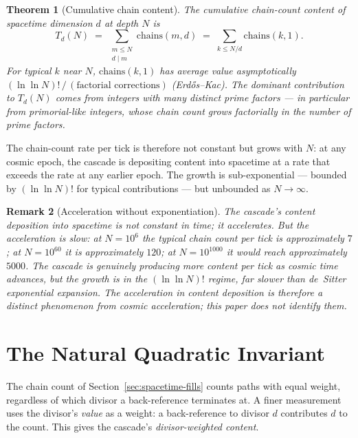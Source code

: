 \documentclass[11pt,a4paper]{article}
\newtheorem{theorem}{Theorem}[section]
\newtheorem{remark}[theorem]{Remark}
\begin{document}
\begin{theorem}[Cumulative chain content]\label{thm:chain-cumulative}
The cumulative chain-count content of spacetime dimension $d$ at
depth $N$ is
\[
T_d(N) \;=\; \sum_{\substack{m \leq N \\ d \mid m}} \mathrm{chains}(m, d) \;=\; \sum_{k \leq N/d} \mathrm{chains}(k, 1).
\]
For typical $k$ near $N$, $\mathrm{chains}(k, 1)$ has average value
asymptotically $(\ln\ln N)!\, /\, (\text{factorial corrections})$
(Erdős--Kac). The dominant contribution to $T_d(N)$ comes from
integers with many distinct prime factors --- in particular from
primorial-like integers, whose chain count grows factorially in the
number of prime factors.
\end{theorem}

\noindent The chain-count rate per tick is therefore not constant
but grows with $N$: at any cosmic epoch, the cascade is depositing
content into spacetime at a rate that exceeds the rate at any
earlier epoch. The growth is sub-exponential --- bounded by
$(\ln\ln N)!$ for typical contributions --- but unbounded as
$N \to \infty$.

\begin{remark}[Acceleration without exponentiation]
The cascade's content deposition into spacetime is not constant in
time; it accelerates. But the acceleration is slow: at $N = 10^6$ the
typical chain count per tick is approximately $7$; at $N = 10^{60}$
it is approximately $120$; at $N = 10^{1000}$ it would reach
approximately $5000$. The cascade is genuinely producing more
content per tick as cosmic time advances, but the growth is in the
$(\ln \ln N)!$ regime, far slower than de~Sitter exponential
expansion. The acceleration in content deposition is therefore a
distinct phenomenon from cosmic acceleration; this paper does not
identify them.
\end{remark}

\section{The Natural Quadratic Invariant}\label{sec:quadratic-invariant}

The chain count of Section~\ref{sec:spacetime-fills} counts paths
with equal weight, regardless of which divisor a back-reference
terminates at. A finer measurement uses the divisor's \emph{value}
as a weight: a back-reference to divisor $d$ contributes $d$ to the
count. This gives the cascade's \emph{divisor-weighted content}.
\end{document}
